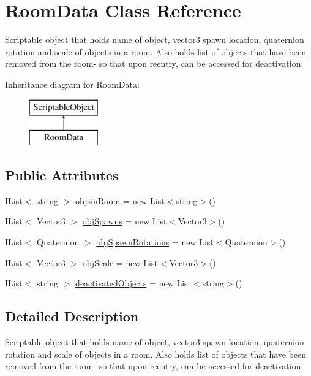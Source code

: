 \hypertarget{class_room_data}{}\section{Room\+Data Class Reference}
\label{class_room_data}


Scriptable object that holds name of object, vector3 spawn location, quaternion rotation and scale of objects in a room. Also holds list of objects that have been removed from the room-\/ so that upon reentry, can be accessed for deactivation  


Inheritance diagram for Room\+Data\+:\begin{figure}[H]
\begin{center}
\leavevmode
\includegraphics[height=2.000000cm]{class_room_data}
\end{center}
\end{figure}
\subsection*{Public Attributes}
\begin{DoxyCompactItemize}
\item 
I\+List$<$ string $>$ \hyperlink{class_room_data_a0f0ce75aa6f2bd68cf3e9a45df98594b}{objsin\+Room} = new List$<$string$>$()
\item 
I\+List$<$ Vector3 $>$ \hyperlink{class_room_data_acd3e5c77c529bdc6b5e781819190c6dd}{obj\+Spawns} = new List$<$Vector3$>$()
\item 
I\+List$<$ Quaternion $>$ \hyperlink{class_room_data_adca49d6897f272f699a5cc98d591efbc}{obj\+Spawn\+Rotations} = new List$<$Quaternion$>$()
\item 
I\+List$<$ Vector3 $>$ \hyperlink{class_room_data_afe1d84ddbb3cfd44b381369ec7468974}{obj\+Scale} = new List$<$Vector3$>$()
\item 
I\+List$<$ string $>$ \hyperlink{class_room_data_a227a8598353e3f63cf17330a93f1a903}{deactivated\+Objects} = new List$<$string$>$()
\end{DoxyCompactItemize}


\subsection{Detailed Description}
Scriptable object that holds name of object, vector3 spawn location, quaternion rotation and scale of objects in a room. Also holds list of objects that have been removed from the room-\/ so that upon reentry, can be accessed for deactivation 



